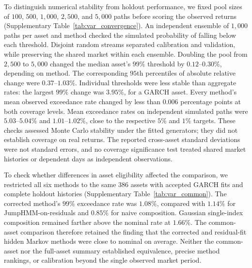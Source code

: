 To distinguish numerical stability from holdout performance, we fixed
pool sizes of $100$, $500$, $1{,}000$, $2{,}500$, and $5{,}000$ paths
before scoring the observed returns
(Supplementary Table~\ref{tab:var_convergence}). An independent ensemble of
$1{,}000$ paths per asset and method checked the simulated probability
of falling below each threshold. Disjoint random streams separated
calibration and validation, while preserving the shared market within
each ensemble. Doubling the pool from $2{,}500$ to $5{,}000$ changed
the median asset's $99\%$ threshold by $0.12$--$0.30\%$, depending
on method. The corresponding $95$th percentiles of absolute relative
change were $0.37$--$1.03\%$. Individual thresholds were less stable
than aggregate rates: the largest $99\%$ change was $3.95\%$, for a
GARCH asset. Every method's mean observed exceedance rate changed by
less than $0.006$ percentage points at both coverage levels. Mean
exceedance rates on independent simulated paths were
$5.03$--$5.04\%$ and $1.01$--$1.02\%$, close to the respective
$5\%$ and $1\%$ targets. These checks assessed Monte Carlo stability
under the fitted generators; they did not establish coverage on real
returns. The reported cross-asset standard deviations were not
standard errors, and no coverage significance test treated shared
market histories or dependent days as independent observations.

\begin{table}[H]
  \centering
  \caption{\textbf{Threshold convergence and independent simulation
    checks.} Relative changes compare pooled thresholds from
    $2{,}500$ and $5{,}000$ separate $249$-day paths, divided by the
    absolute $5{,}000$-path threshold. Median and P95 denote the
    cross-asset median and $95$th percentile. Simulation rates are
    mean per-asset exceedance percentages on $1{,}000$ independent
    paths, using the $5{,}000$-path threshold. Summaries cover the
    $416$ holdout-eligible assets, or $386$ for generalized
    autoregressive conditional heteroskedasticity (GARCH).
    SIM denotes the single-index model; JumpHMM denotes the hidden
    Markov generator with jumps disabled.}
  \label{tab:var_convergence}
  \footnotesize
  \setlength{\tabcolsep}{3pt}
  
\end{table}

To check whether differences in asset eligibility affected the
comparison, we restricted all six methods to the same $386$ assets
with accepted GARCH fits and complete holdout histories
(Supplementary Table~\ref{tab:var_common}). The corrected method's $99\%$
exceedance rate was $1.08\%$, compared with $1.14\%$ for
JumpHMM-on-residuals and $0.85\%$ for naive composition. Gaussian
single-index composition remained farther above the nominal rate at
$1.66\%$. The common-asset comparison therefore retained the finding
that the corrected and residual-fit hidden Markov methods were close
to nominal on average. Neither the common-asset nor the full-asset
summary established equivalence, precise method rankings, or
calibration beyond the single observed market period.

